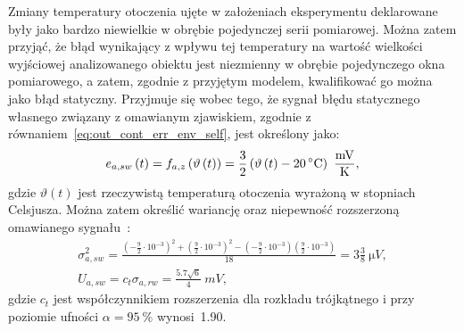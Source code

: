 Zmiany temperatury otoczenia ujęte w założeniach eksperymentu deklarowane były jako bardzo niewielkie w obrębie pojedynczej serii pomiarowej. Można zatem przyjąć, że błąd wynikający z wpływu tej temperatury na wartość wielkości wyjściowej analizowanego obiektu jest niezmienny w obrębie pojedynczego okna pomiarowego, a zatem, zgodnie z przyjętym modelem, kwalifikować go można jako błąd statyczny. Przyjmuje się wobec tego, że sygnał błędu statycznego własnego związany z omawianym zjawiskiem, zgodnie z równaniem~\eqref{eq:out_cont_err_env_self}, jest określony jako:
\begin{equation}
e_{a,sw} \emb{t} = f_{a,z} \left( \vartheta \emb{t} \right) = \frac{3}{2} \left( \vartheta \emb{t} - \qty{20}{\degreeCelsius} \right)~\unit{\frac{mV}{K}} \label{eq:sym_parta_stat_err},
\end{equation}
gdzie $\vartheta(t)$ jest rzeczywistą temperaturą otoczenia wyrażoną w stopniach Celsjusza. Można zatem określić wariancję oraz niepewność rozszerzoną omawianego sygnału~\cite{jcgm_guide}:
\begin{gather}
\sigma_{a,sw}^{2} = \frac{\left( -\frac{9}{2} \cdot 10^{-3} \right)^{2} + \left( \frac{9}{2} \cdot 10^{-3} \right)^{2} - \left( -\frac{9}{2} \cdot 10^{-3} \right) \left( \frac{9}{2} \cdot 10^{-3} \right)}{18} = 3 \frac{3}{8}~\unit{\micro V} \label{eq:sym_parta_stat_var}, \\
U_{a,sw} = c_{t} \sigma_{a,rw} = \frac{\num{5.7} \sqrt{6}}{4}~\unit{mV} \label{eq:sym_parta_stat_unc},
\end{gather}
gdzie $c_{t}$ jest współczynnikiem rozszerzenia dla rozkładu trójkątnego i przy poziomie ufności $\alpha = \qty{95}{\percent}$ wynosi~\num{1.90}.

